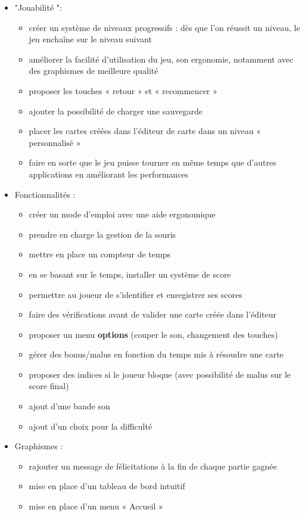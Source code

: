 \documentclass[english,11pt]{report}
\begin{document}
\begin{itemize}[label=\textbullet]
    \item{"Jouabilité ":}
    \begin{itemize}
        \item{créer un système de niveaux progressifs : dès que l’on réussit un niveau, le jeu enchaîne sur le niveau suivant}
        \item{améliorer la facilité d’utilisation du jeu, son ergonomie, notamment avec des graphismes de meilleure qualité}
        \item{proposer les touches « retour » et « recommencer »}
        \item{ajouter la possibilité de charger une sauvegarde}
        \item{placer les cartes créées dans l'éditeur de carte dans un niveau « personnalisé »}
        \item{faire en sorte que le jeu puisse tourner en même temps que d’autres applications en améliorant les performances}
    \end{itemize}
    \item{Fonctionnalités :}
    \begin{itemize}
        \item{créer un mode d’emploi avec une aide ergonomique}
        \item{prendre en charge la gestion de la souris}
        \item{mettre en place un compteur de temps}
        \item{en se basant sur le temps, installer un système de score}
        \item{permettre au joueur de s'identifier et enregistrer ses scores}
        \item{faire des vérifications avant de valider une carte créée dans l’éditeur}
        \item{proposer un menu \textbf{options} (couper le son, changement des touches)}
        \item{gérer des bonus/malus en fonction du temps mis à résoudre une carte}
        \item{proposer des indices si le joueur bloque (avec possibilité de malus sur le score final)}
        \item{ajout d’une bande son}
        \item{ajout d’un choix pour la difficulté}
    \end{itemize}
    \item{Graphismes :}
    \begin{itemize}
        \item{rajouter un message de félicitations à la fin de chaque partie gagnée}
        \item{mise en place d’un tableau de bord intuitif}
        \item{mise en place d’un menu « Accueil »}
    \end{itemize}
\end{itemize}
\end{document}
